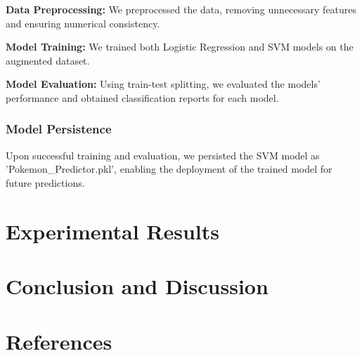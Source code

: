 \documentclass[conference]{IEEEtran}
\begin{document}
\textbf{Data Preprocessing:} We preprocessed the data, removing unnecessary features and ensuring numerical consistency.

\textbf{Model Training:} We trained both Logistic Regression and SVM models on the augmented dataset.

\textbf{Model Evaluation:} Using train-test splitting, we evaluated the models' performance and obtained classification reports for each model.

\subsection{Model Persistence}

Upon successful training and evaluation, we persisted the SVM model as 'Pokemon\_Predictor.pkl', enabling the deployment of the trained model for future predictions.
    

    \chapter{Experimental Results}
    \chapter{Conclusion and Discussion}
    \chapter{References}
\end{document}
